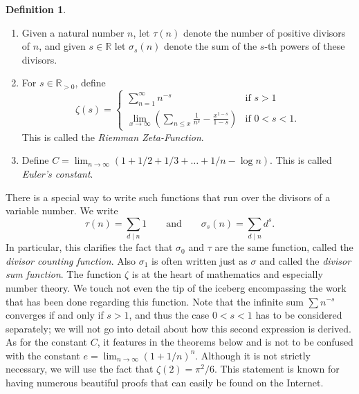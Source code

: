 \documentclass{article}
\theoremstyle{definition}
\newtheorem{definition}{Definition}
\newcommand\RR{\mathbb R}
\begin{document}
\begin{definition}
    \item
    \begin{enumerate}
        \item Given a natural number \(n\), let \(\tau(n)\) denote the number of positive divisors of \(n\), and given \(s\in\RR\) let \(\sigma_s(n)\) denote the sum of the \(s\)-th powers of these divisors.

        \item For \(s\in\RR_{>0}\), define
            \[
                \zeta(s) =
                \begin{cases}
                    \sum_{n=1}^{\infty} n^{-s} & \text{if } s > 1 \\
                    \lim_{x\to\infty} \left(\sum_{n\le x} \frac{1}{n^s} - \frac{x^{1-s}}{1-s}\right) & \text{if } 0 < s < 1.
                \end{cases}
            \]
            This is called the \textit{Riemman Zeta-Function}.

        \item Define \(C = \lim_{n\to\infty} (1 + 1/2 + 1/3 + \ldots + 1/n - \log n)\).
            This is called \textit{Euler's constant}.
    \end{enumerate}
\end{definition}

There is a special way to write such functions that run over the divisors of a variable number.
We write
\[\tau(n) = \sum_{d\mid n} 1 \qquad \text{and} \qquad \sigma_s(n) = \sum_{d\mid n} d^s.\]
In particular, this clarifies the fact that \(\sigma_0\) and \(\tau\) are the same function, called the \textit{divisor counting function}.
Also \(\sigma_1\) is often written just as \(\sigma\) and called the \textit{divisor sum function}.
The function \(\zeta\) is at the heart of mathematics and especially number theory.
We touch not even the tip of the iceberg encompassing the work that has been done regarding this function.
Note that the infinite sum \(\sum n^{-s}\) converges if and only if \(s>1\), and thus the case \(0<s<1\) has to be considered separately; we will not go into detail about how this second expression is derived.
As for the constant \(C\), it features in the theorems below and is not to be confused with the constant \(e = \lim_{n\to\infty} (1+1/n)^n\).
Although it is not strictly necessary, we will use the fact that \(\zeta(2) = \pi^2/6\).
This statement is known for having numerous beautiful proofs that can easily be found on the Internet.
\end{document}
